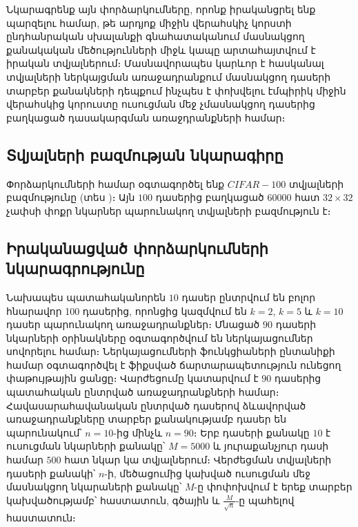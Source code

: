 \documentclass[12pt]{article}
\begin{document}
Նկարագրենք այն փորձարկումները, որոնք իրականցրել ենք պարզելու համար, թե արդյոք միջին վերահսկիչ կորստի ընդհանրական  սխալանքի գնահատականում մասնակցող քանակական մեծությունների միջև կապը  արտահայտվում է  իրական տվյալներում։ Մասնավորապես կարևոր է հասկանալ տվյալների ներկայցման առաջադրանքում մասնակցող դասերի տարբեր քանակների  դեպքում ինչպես է փոխվելու էմպիրիկ միջին վերահսկից կորուստը ուսուցման մեջ չմասնակցող դասերից բաղկացած դասակարգման առաջդրանքների համար։
{}


\subsection*{\hfill Տվյալների բազմության նկարագիրը \hfill} \noindent
\par Փորձարկումների համար օգտագործել ենք $CIFAR-100$ տվյալների բազմությունը (տես \cite{bib_item_14})։ Այն $100$ դասերից բաղկացած $60000$ հատ $32\times 32$ չափսի փոքր նկարներ պարունակող տվյալների բազմություն է։
{}


\subsection*{\hfill Իրականացված փորձարկումների նկարագրությունը \hfill} \noindent



\par Նախապես պատահականորեն $10$ դասեր ընտրվում են բոլոր հնարավոր 100 դասերից, որոնցից կազմվում են $k=2$, $k=5$ և $k=10$ դասեր պարունակող առաջադրանքներ։ Մնացած $90$ դասերի նկարների օրինակները օգտագործվում են ներկայացումներ սովորելու համար։ Ներկայացումների ֆունկցիաների ընտանիքի համար օգտագործվել  է ֆիքսված ճարտարապետություն ունեցող փաթույթային ցանցը։ Վարժեցումը կատարվում է $90$ դասերից պատահական ընտրված առաջադրանքների համար։ Հավասարահավանական ընտրված դասերով ձևավորված առաջադրանքները տարբեր քանակությամբ դասեր են պարունակում՝ $n=10$-ից մինչև $n=90$։ Երբ դասերի քանակը $10$ է ուսուցման նկարների քանակը՝ $M=5000$ և յուրաքանչյուր դասի համար $500$ հատ նկար կա տվյալներում։ Վերժեցման տվյալների դասերի քանակի՝ $n$-ի,  մեծացումից կախված ուսուցման մեջ մասնակցող նկարաների քանակը՝ $M$-ը փոփոխվում է երեք տարբեր կախվածությամբ՝ հաստատուն, գծային և $\frac{M}{\sqrt{n}}$-ը պահելով հաստատուն։
\end{document}
